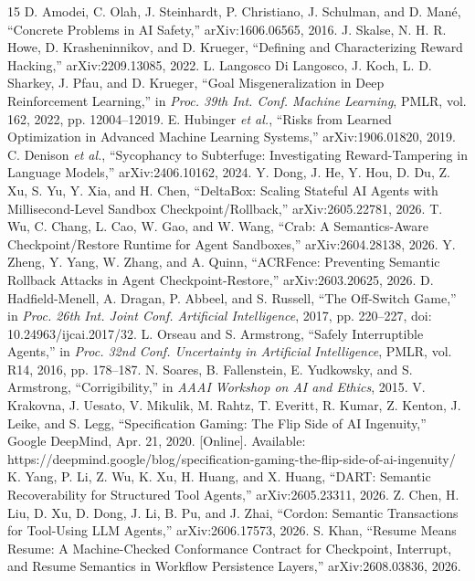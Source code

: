 \documentclass[conference]{IEEEtran}
\begin{document}
\begin{thebibliography}{15}
 D. Amodei, C. Olah, J. Steinhardt, P. Christiano, J. Schulman, and D. Man\'e, ``Concrete Problems in AI Safety,'' arXiv:1606.06565, 2016.
 J. Skalse, N. H. R. Howe, D. Krasheninnikov, and D. Krueger, ``Defining and Characterizing Reward Hacking,'' arXiv:2209.13085, 2022.
 L. Langosco Di Langosco, J. Koch, L. D. Sharkey, J. Pfau, and D. Krueger, ``Goal Misgeneralization in Deep Reinforcement Learning,'' in \emph{Proc. 39th Int. Conf. Machine Learning}, PMLR, vol. 162, 2022, pp. 12004--12019.
 E. Hubinger \emph{et al.}, ``Risks from Learned Optimization in Advanced Machine Learning Systems,'' arXiv:1906.01820, 2019.
 C. Denison \emph{et al.}, ``Sycophancy to Subterfuge: Investigating Reward-Tampering in Language Models,'' arXiv:2406.10162, 2024.
 Y. Dong, J. He, Y. Hou, D. Du, Z. Xu, S. Yu, Y. Xia, and H. Chen, ``DeltaBox: Scaling Stateful AI Agents with Millisecond-Level Sandbox Checkpoint/Rollback,'' arXiv:2605.22781, 2026.
 T. Wu, C. Chang, L. Cao, W. Gao, and W. Wang, ``Crab: A Semantics-Aware Checkpoint/Restore Runtime for Agent Sandboxes,'' arXiv:2604.28138, 2026.
 Y. Zheng, Y. Yang, W. Zhang, and A. Quinn, ``ACRFence: Preventing Semantic Rollback Attacks in Agent Checkpoint-Restore,'' arXiv:2603.20625, 2026.
 D. Hadfield-Menell, A. Dragan, P. Abbeel, and S. Russell, ``The Off-Switch Game,'' in \emph{Proc. 26th Int. Joint Conf. Artificial Intelligence}, 2017, pp. 220--227, doi: 10.24963/ijcai.2017/32.
 L. Orseau and S. Armstrong, ``Safely Interruptible Agents,'' in \emph{Proc. 32nd Conf. Uncertainty in Artificial Intelligence}, PMLR, vol. R14, 2016, pp. 178--187.
 N. Soares, B. Fallenstein, E. Yudkowsky, and S. Armstrong, ``Corrigibility,'' in \emph{AAAI Workshop on AI and Ethics}, 2015.
 V. Krakovna, J. Uesato, V. Mikulik, M. Rahtz, T. Everitt, R. Kumar, Z. Kenton, J. Leike, and S. Legg, ``Specification Gaming: The Flip Side of AI Ingenuity,'' Google DeepMind, Apr. 21, 2020. [Online]. Available: https://deepmind.google/blog/specification-gaming-the-flip-side-of-ai-ingenuity/
 K. Yang, P. Li, Z. Wu, K. Xu, H. Huang, and X. Huang, ``DART: Semantic Recoverability for Structured Tool Agents,'' arXiv:2605.23311, 2026.
 Z. Chen, H. Liu, D. Xu, D. Dong, J. Li, B. Pu, and J. Zhai, ``Cordon: Semantic Transactions for Tool-Using LLM Agents,'' arXiv:2606.17573, 2026.
 S. Khan, ``Resume Means Resume: A Machine-Checked Conformance Contract for Checkpoint, Interrupt, and Resume Semantics in Workflow Persistence Layers,'' arXiv:2608.03836, 2026.
\end{thebibliography}
\end{document}
